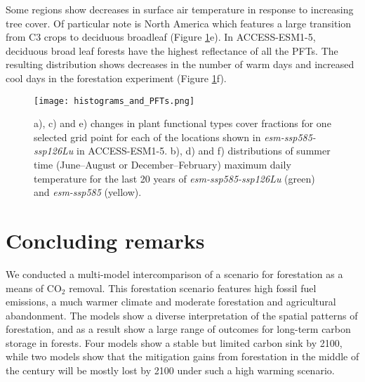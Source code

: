 \documentclass[draft]{agujournal2019}
\begin{document}
Some regions show decreases in surface air temperature in response to increasing tree cover.
Of particular note is North America which features a large transition from C3 crops to deciduous broadleaf (Figure \ref{fig:tasmax_distribution}e).
In ACCESS-ESM1-5, deciduous broad leaf forests have the highest reflectance of all the PFTs.
The resulting distribution shows decreases in the number of warm days and increased cool days in the forestation experiment (Figure \ref{fig:tasmax_distribution}f).


\begin{figure}
    \texttt{[image: histograms\_and\_PFTs.png]}
    \caption{a), c) and e) changes in plant functional types cover fractions for one selected grid point for each of the locations shown in \textit{esm-ssp585-ssp126Lu} in ACCESS-ESM1-5. b), d) and f) distributions of summer time (June--August or December--February) maximum daily temperature for the last 20 years of \textit{esm-ssp585-ssp126Lu} (green) and \textit{esm-ssp585} (yellow).}
    \label{fig:tasmax_distribution}
\end{figure}

\section{Concluding remarks}

We conducted a multi-model intercomparison of a scenario for forestation as a means of CO$_2$ removal.
This forestation scenario features high fossil fuel emissions, a much warmer climate and moderate forestation and agricultural abandonment.
The models show a diverse interpretation of the spatial patterns of forestation, and as a result show a large range of outcomes for long-term carbon storage in forests.
Four models show a stable but limited carbon sink by 2100, while two models show that the mitigation gains from forestation in the middle of the century will be mostly lost by 2100 under such a high warming scenario.
\end{document}
